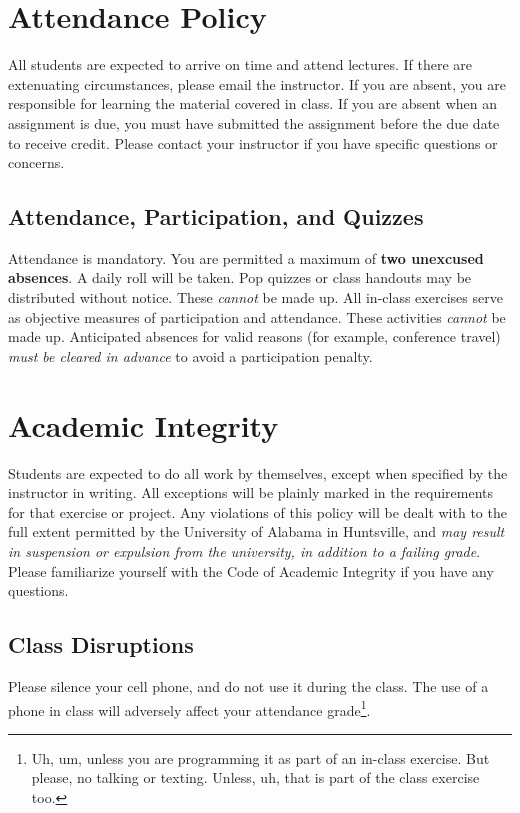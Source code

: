 \documentclass[11pt,oneside,openany]{book}
\begin{document}
\chapter{Attendance Policy}
All students are expected to arrive on time and attend lectures. If there are extenuating circumstances, please email the instructor. If you are absent, you are responsible for learning the material covered in class. If you are absent when an assignment is due, you must have submitted the assignment before the due date to receive credit. Please contact your instructor if you have specific questions or concerns.

\section*{Attendance, Participation, and Quizzes}
Attendance is mandatory. You are permitted a maximum of \textbf{two unexcused absences}. A daily roll will be taken. Pop quizzes or class handouts may be distributed without notice. These \emph{cannot} be made up. All in-class exercises serve as objective measures of participation and attendance. These activities \emph{cannot} be made up. Anticipated absences for valid reasons (for example, conference travel) \emph{must be cleared in advance} to avoid a participation penalty.

\chapter{Academic Integrity}
Students are expected to do all work by themselves, except when specified by the instructor in writing. All exceptions will be plainly marked in the requirements for that exercise or project. Any violations of this policy will be dealt with to the full extent permitted by the University of Alabama in Huntsville, and \emph{may result in suspension or expulsion from the university, in addition to a failing grade}. Please familiarize yourself with the Code of Academic Integrity if you have any questions.

\section*{Class Disruptions}
Please silence your cell phone, and do not use it during the class. The use of a phone in class will adversely affect your attendance grade\footnote{Uh, um, unless you are programming it as part of an in-class exercise. But please, no talking or texting. Unless, uh, that is part of the class exercise too.}.
\end{document}
